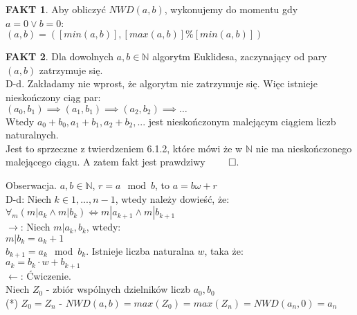 \documentclass{article}
\theoremstyle{definition}
\theoremstyle{definition}
\theoremstyle{definition}
\theoremstyle{definition}
\newtheorem*{fakt}{FAKT}
\begin{document}
\begin{fakt}
    Aby obliczyć $NWD(a,b)$, wykonujemy do momentu gdy $a=0 \lor b=0$:\\
    $(a,b)=([min(a,b)],[max(a,b)] \% [min(a,b)])$
\end{fakt}

\begin{fakt}
    Dla dowolnych $a,b\in\mathbb{N}$ algorytm Euklidesa, 
    zaczynający od pary $(a,b)$ zatrzymuje się.\\
    D-d. Zakładamy nie wprost, że algorytm nie zatrzymuje się. 
    Więc istnieje nieskończony ciąg par:\\
    $(a_0,b_1)\implies(a_1,b_1)\implies(a_2,b_2)\implies\dots$\\
    Wtedy $a_0+b_0, a_1+b_1, a_2+b_2, ...$ jest nieskończonym malejącym ciągiem liczb naturalnych.\\
    Jest to sprzeczne z twierdzeniem 6.1.2, które mówi że w $\mathbb{N}$ nie ma nieskończonego malejącego ciągu.
    A zatem fakt jest prawdziwy $\qed$.
\end{fakt}

Obserwacja. $a,b\in\mathbb{N}$, $r=a \mod b$, to $a=b\omega + r$\\
D-d: Niech $k\in{1,...,n-1}$, wtedy należy dowieść, że:\\
$\forall_{m} (m|a_k \land m| b_k) \iff m|a_{k+1} \land m|b_{k+1}$\\
$\rightarrow$: Niech $m|a_k,b_k$, wtedy:\\
$m|b_k=a_k+1$\\
$b_{k+1}=a_k\mod b_k$. Istnieje liczba naturalna $w$, taka że:\\
$a_k=b_k\cdot w + b_{k+1}$\\
$\leftarrow$: Ćwiczenie.\\

Niech $Z_0$ - zbiór wspólnych dzielników liczb $a_0,b_0$\\
(*) $Z_0=Z_n$ - $NWD(a,b)=max(Z_0)=max(Z_n)=NWD(a_n,0)=a_n$
\end{document}
